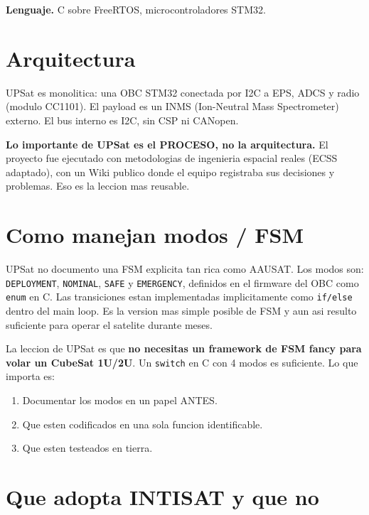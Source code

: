 \documentclass[11pt,a4paper,oneside,openright]{book}
\begin{document}
\textbf{Lenguaje.} C sobre FreeRTOS, microcontroladores STM32.

\section{Arquitectura}

UPSat es monolitica: una OBC STM32 conectada por I2C a EPS, ADCS y
radio (modulo CC1101). El payload es un INMS (Ion-Neutral Mass
Spectrometer) externo. El bus interno es I2C, sin CSP ni CANopen.

\textbf{Lo importante de UPSat es el PROCESO, no la arquitectura.} El
proyecto fue ejecutado con metodologias de ingenieria espacial reales
(ECSS adaptado), con un Wiki publico donde el equipo registraba sus
decisiones y problemas. Eso es la lec\-cion mas reusable.

\section{Como manejan modos / FSM}

UPSat no documento una FSM explicita tan rica como AAUSAT. Los modos
son: \texttt{DEPLOYMENT}, \texttt{NOMINAL}, \texttt{SAFE} y
\texttt{EMERGENCY}, definidos en el firmware del OBC como
\texttt{enum} en C. Las transiciones estan implementadas implicitamente
como \texttt{if/else} dentro del main loop. Es la version mas simple
posible de FSM y aun asi resulto suficiente para operar el satelite
durante meses.

\begin{intui}
La leccion de UPSat es que \textbf{no necesitas un framework de FSM
fancy para volar un CubeSat 1U/2U}. Un \texttt{switch} en C con 4 modos
es suficiente. Lo que importa es:
\begin{enumerate}[leftmargin=2em]
  \item Documentar los modos en un papel ANTES.
  \item Que esten codificados en una sola funcion identificable.
  \item Que esten testeados en tierra.
\end{enumerate}
\end{intui}

\section{Que adopta INTISAT y que no}
\end{document}
